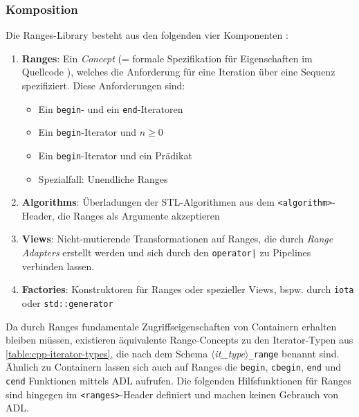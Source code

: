 \documentclass[runningheads]{llncs}
\begin{document}
\subsubsection{Komposition}

Die Ranges-Library besteht aus den folgenden vier Komponenten \cite[S.617]{profcpp}:

\begin{enumerate}[1.]
	\item \textbf{Ranges}: Ein \textit{Concept} (= formale Spezifikation für Eigenschaften im Quellcode \cite[vgl. S.454 ff.]{profcpp}), welches die Anforderung für eine Iteration über eine Sequenz spezifiziert.
	      Diese Anforderungen sind:

	      \begin{itemize}
		      \item Ein \texttt{begin}- und ein \texttt{end}-Iteratoren
		      \item Ein \texttt{begin}-Iterator und $n\geqslant0$
		      \item Ein \texttt{begin}-Iterator und ein Prädikat
		      \item Spezialfall: Unendliche Ranges
	      \end{itemize}

	\item \textbf{Algorithms}: Überladungen der STL-Algorithmen aus dem \texttt{<algorithm>}-Header, die Ranges als Argumente akzeptieren

	\item \textbf{Views}: Nicht-mutierende Transformationen auf Ranges, die durch \textit{Range Adapters} erstellt werden und sich durch den \texttt{operator|} zu Pipelines verbinden lassen.

	\item \textbf{Factories}: Konstruktoren für Ranges oder spezieller Views, bspw. durch \texttt{iota} oder \texttt{std::generator}
\end{enumerate}

Da durch Ranges fundamentale Zugriffseigenschaften von Containern erhalten bleiben müssen, existieren äquivalente Range-Concepts zu den Iterator-Typen aus \autoref{table:cpp-iterator-types}, die nach dem Schema $\langle$\textit{it\_type}$\rangle$\texttt{\_range} benannt sind.
Ähnlich zu Containern lassen sich auch auf Ranges die \texttt{begin}, \texttt{cbegin}, \texttt{end} und \texttt{cend} Funktionen mittels ADL aufrufen.
Die folgenden Hilfsfunktionen für Ranges sind hingegen im \texttt{<ranges>}-Header definiert und machen keinen Gebrauch von ADL.
\end{document}
